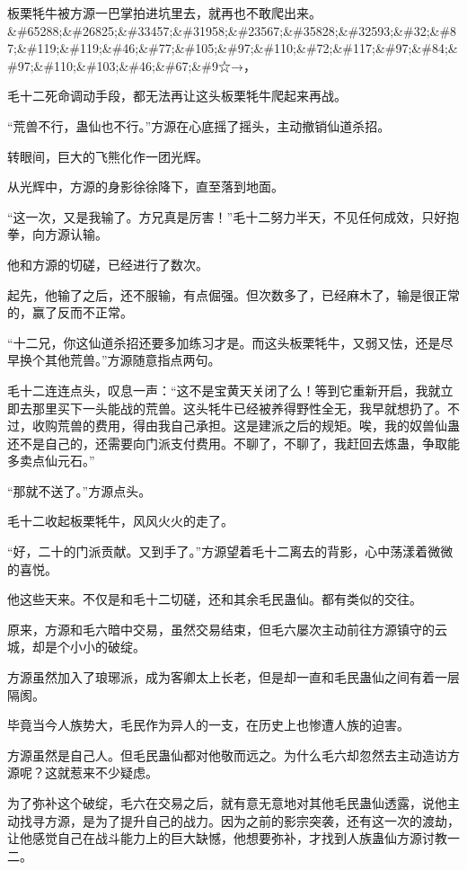 
\begin{this_body}

板栗牦牛被方源一巴掌拍进坑里去，就再也不敢爬出来。\&\#65288;\&\#26825;\&\#33457;\&\#31958;\&\#23567;\&\#35828;\&\#32593;\&\#32;\&\#87;\&\#119;\&\#119;\&\#46;\&\#77;\&\#105;\&\#97;\&\#110;\&\#72;\&\#117;\&\#97;\&\#84;\&\#97;\&\#110;\&\#103;\&\#46;\&\#67;\&\#9☆→，

毛十二死命调动手段，都无法再让这头板栗牦牛爬起来再战。

“荒兽不行，蛊仙也不行。”方源在心底摇了摇头，主动撤销仙道杀招。

转眼间，巨大的飞熊化作一团光辉。

从光辉中，方源的身影徐徐降下，直至落到地面。

“这一次，又是我输了。方兄真是厉害！”毛十二努力半天，不见任何成效，只好抱拳，向方源认输。

他和方源的切磋，已经进行了数次。

起先，他输了之后，还不服输，有点倔强。但次数多了，已经麻木了，输是很正常的，赢了反而不正常。

“十二兄，你这仙道杀招还要多加练习才是。而这头板栗牦牛，又弱又怯，还是尽早换个其他荒兽。”方源随意指点两句。

毛十二连连点头，叹息一声：“这不是宝黄天关闭了么！等到它重新开启，我就立即去那里买下一头能战的荒兽。这头牦牛已经被养得野性全无，我早就想扔了。不过，收购荒兽的费用，得由我自己承担。这是建派之后的规矩。唉，我的奴兽仙蛊还不是自己的，还需要向门派支付费用。不聊了，不聊了，我赶回去炼蛊，争取能多卖点仙元石。”

“那就不送了。”方源点头。

毛十二收起板栗牦牛，风风火火的走了。

“好，二十的门派贡献。又到手了。”方源望着毛十二离去的背影，心中荡漾着微微的喜悦。

他这些天来。不仅是和毛十二切磋，还和其余毛民蛊仙。都有类似的交往。

原来，方源和毛六暗中交易，虽然交易结束，但毛六屡次主动前往方源镇守的云城，却是个小小的破绽。

方源虽然加入了琅琊派，成为客卿太上长老，但是却一直和毛民蛊仙之间有着一层隔阂。

毕竟当今人族势大，毛民作为异人的一支，在历史上也惨遭人族的迫害。

方源虽然是自己人。但毛民蛊仙都对他敬而远之。为什么毛六却忽然去主动造访方源呢？这就惹来不少疑虑。

为了弥补这个破绽，毛六在交易之后，就有意无意地对其他毛民蛊仙透露，说他主动找寻方源，是为了提升自己的战力。因为之前的影宗突袭，还有这一次的渡劫，让他感觉自己在战斗能力上的巨大缺憾，他想要弥补，才找到人族蛊仙方源讨教一二。


\end{this_body}
